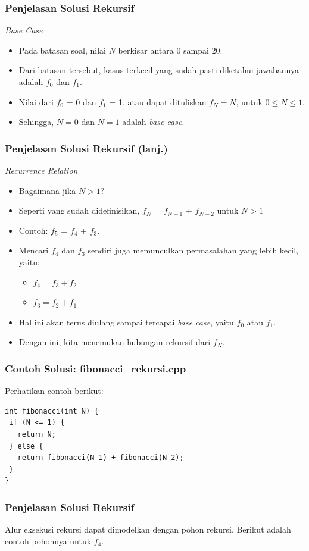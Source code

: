 \begin{frame}
\frametitle{Penjelasan Solusi Rekursif}
\textit{Base Case}
\begin{itemize}
  \item Pada batasan soal, nilai $N$ berkisar antara $0$ sampai $20$.
  \item Dari batasan tersebut, kasus terkecil yang sudah pasti diketahui jawabannya adalah $f_0$ dan $f_1$.
  \item Nilai dari $f_0$ = 0 dan $f_1$ = 1, atau dapat dituliskan $f_N = N$, untuk $0 \le N \le 1$.
  \item Sehingga, $N=0$ dan $N=1$ adalah \textit{base case}.
\end{itemize}
\end{frame}

\begin{frame}
\frametitle{Penjelasan Solusi Rekursif (lanj.) }
\textit{Recurrence Relation}
\begin{itemize}
  \item Bagaimana jika $N > 1$?
  \item Seperti yang sudah didefinisikan, $f_N$ = $f_{N-1}$ + $f_{N-2}$ untuk $N > 1$
  \item Contoh: $f_5$ = $f_4$ + $f_3$.
  \item Mencari $f_4$ dan $f_3$ sendiri juga memunculkan permasalahan yang lebih kecil, yaitu:
  \begin{itemize}
    \item $f_4 = f_3 + f_2$
    \item $f_3 = f_2 + f_1$ 
  \end{itemize}
  \item Hal ini akan terus diulang sampai tercapai \textit{base case}, yaitu $f_0$ atau $f_1$.
  \item Dengan ini, kita menemukan hubungan rekursif dari $f_N$.
\end{itemize}
\end{frame}

\begin{frame}[fragile]
\frametitle{Contoh Solusi: fibonacci\_rekursi.cpp}
Perhatikan contoh berikut:
\begin{lstlisting}
int fibonacci(int N) {
 if (N <= 1) {
   return N;
 } else {
   return fibonacci(N-1) + fibonacci(N-2);
 }
}
\end{lstlisting}
\end{frame}

\begin{frame}[fragile]
\frametitle{Penjelasan Solusi Rekursif}
Alur eksekusi rekursi dapat dimodelkan dengan pohon rekursi. Berikut adalah contoh pohonnya untuk $f_4$.
\end{frame}

